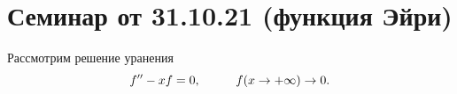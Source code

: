 \section{Семинар от 31.10.21 (функция Эйри)}

Рассмотрим решение уранения
\begin{equation*}
    f'' - x f  = 0,
    \hspace{10 mm} 
    f(x \to + \infty) \to 0.
\end{equation*}
